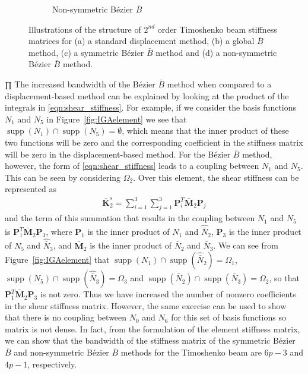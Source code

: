 \documentclass{article}
\begin{document}
\begin{figure}[!htb]
\begin{subfigure}[b]{0.24\linewidth}
        \caption{Non-symmetric B\'ezier $\bar{B}$}
    \end{subfigure}
    \caption{Illustrations of the structure of $2^{nd}$ order Timoshenko beam stiffness matrices for (a) a standard displacement method, (b) a global $\bar{B}$ method, (c) a symmetric B\'ezier $\bar{B}$ method and (d) a non-symmetric B\'ezier $\bar{B}$ method.}
    \label{fig:stiffness_matrix}
\end{figure}
∏
The increased bandwidth of the  B\'ezier $\bar{B}$ method when compared to a displacement-based method can be explained by looking at the product of the integrals in \eqref{eqn:shear_stiffness}. For example, if we consider the basis functions $N_{1}$ and $N_{5}$ in Figure~\ref{fig:IGAelement} we see that $\operatorname{supp}(N_{1}) \cap{} \operatorname{supp}(N_{5}) = \emptyset$, which means that the inner product of these two functions will be zero and the corresponding coefficient in the stiffness matrix will be zero in the displacement-based method. For the B\'ezier $\bar{B}$ method, however, the form of \eqref{eqn:shear_stiffness} leads to a coupling between $N_{1}$ and $N_{5}$. This can be seen by considering $\Omega_2$. Over this element, the shear stiffness can be represented as
\begin{align}
	\bar{\mathbf{K}}^s_2 = \sum_{i=1}^3 \sum_{j=1}^3 \mathbf{P}_i^T\bar{\mathbf{M}}_2\mathbf{P}_j
\end{align}
and the term of this summation that results in the coupling between $N_{1}$ and $N_{5}$ is $\mathbf{P}_1^T\bar{\mathbf{M}}_2\mathbf{P}_3$, where $\mathbf{P}_1$ is the inner product of $N_{1}$ and $\hat{\bar{N}}_{2}$, $\mathbf{P}_3$ is the inner product of $N_{5}$ and $\hat{\bar{N}}_{3}$, and $\bar{\mathbf{M}}_2$ is the inner product of $\bar{N}_{2}$ and $\bar{N}_{3}$. We can see from Figure~\ref{fig:IGAelement} that $\operatorname{supp}(N_{1})\cap{}\operatorname{supp}(\hat{\bar{N}}_{2})=\Omega_1$, $\operatorname{supp}(N_{5})\cap{}\operatorname{supp}(\hat{\bar{N}}_{3})=\Omega_3$ and $\operatorname{supp}(\bar{N}_{2})\cap{}\operatorname{supp}(\bar{N}_{3})=\Omega_2$, so that $\mathbf{P}_1^T\bar{\mathbf{M}}_2\mathbf{P}_3$ is not zero. Thus we have increased the number of nonzero coefficients in the shear stiffness matrix. However, the same exercise can be used to show that there is no coupling between $N_{0}$ and $N_{6}$ for this set of basis functions so matrix is not dense.  In fact, from the formulation of the element stiffness matrix, we can show that the bandwidth of the stiffness matrix of the symmetric B\'ezier $\bar{B}$ and non-symmetric B\'ezier $\bar{B}$ methods for the Timoshenko beam are $6p-3$ and $4p-1$, respectively. 
\end{document}

